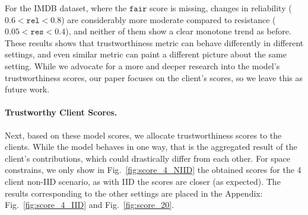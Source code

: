 \documentclass{uai2026}
\begin{document}
For the IMDB dataset, where the $\mathtt{fair}$ score is missing, changes in reliability ($0.6<\mathtt{rel}<0.8$) are considerably more moderate compared to resistance ($0.05<\mathtt{res}<0.4$), and neither of them show a clear monotone trend as before. These results shows that trustworthiness metric can behave differently in different settings, and even similar metric can paint a different picture about the same setting. While we advocate for a more and deeper research into the model's trustworthiness scores, our paper focuses on the client's scores, so we leave this as future work.

\paragraph{Trustworthy Client Scores. }

Next, based on these model scores, we allocate trustworthiness scores to the clients. While the model behaves in one way, that is the aggregated result of the client's contributions, which could drastically differ from each other. For space constrains, we only show in Fig.~\ref{fig:score_4_NIID} the obtained scores for the 4 client non-IID scenario, as with IID the scores are closer (as expected). The results corresponding to the other settings are placed in the Appendix: Fig.~\ref{fig:score_4_IID} and Fig.~\ref{fig:score_20}.
\end{document}
